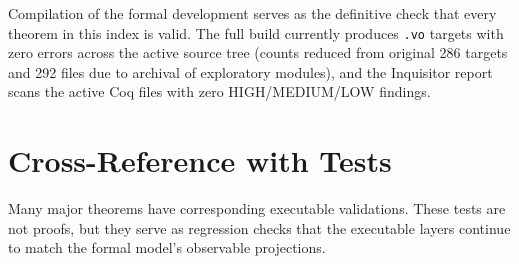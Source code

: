 Compilation of the formal development serves as the definitive check that every theorem in this index is valid. The full build currently produces \texttt{.vo} targets with zero errors across the active source tree (counts reduced from original 286 targets and 292 files due to archival of exploratory modules), and the Inquisitor report scans the active Coq files with zero HIGH/MEDIUM/LOW findings.

\section{Cross-Reference with Tests}

Many major theorems have corresponding executable validations. These tests are not proofs, but they serve as regression checks that the executable layers continue to match the formal model's observable projections.
